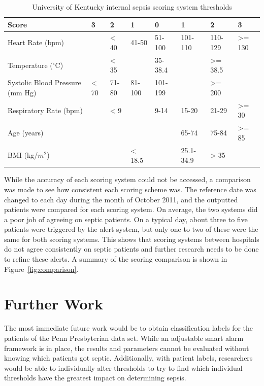 \documentclass{sig-alternate}
\begin{document}
\begin{table}
\renewcommand{\arraystretch}{1.5}
  \begin{tabular}{| l | l | l | l | l | l | l | l |}
\hline

{\bf Score} & {\bf 3} & {\bf 2} & {\bf 1} & {\bf 0} & {\bf 1} & {\bf 2} & {\bf 3}\\ \hline
Heart Rate (bpm) & & < 40 & 41-50 & 51-100 & 101-110 & 110-129 & >= 130\\ \hline
Temperature ($^\circ$C) & & < 35 & & 35-38.4 & & >= 38.5 &\\ \hline
Systolic Blood Pressure (mm Hg) & < 70 & 71-80 & 81-100 & 101-199 & & >= 200 & \\ \hline
Respiratory Rate (bpm) & & < 9 & & 9-14 & 15-20 & 21-29 & >= 30\\ \hline
Age (years) & & & & & 65-74 & 75-84 & >= 85\\ \hline
BMI (kg/$m^2$) & & & < 18.5 & & 25.1-34.9 & > 35 & \\ \hline

 \end{tabular}
	\caption{University of Kentucky internal sepsis scoring system thresholds}
  \label{tab:uk_table}
\end{table}

While the accuracy of each scoring system could not be accessed, a comparison was made to see how consistent each scoring scheme was.  The reference date was changed to each day during the month of October 2011, and the outputted patients were compared for each scoring system.  On average, the two systems did a poor job of agreeing on septic patients.  On a typical day, about three to five patients were triggered by the alert system, but only one to two of these were the same for both scoring systems.  This shows that scoring systems between hospitals do not agree consistently on septic patients and further research needs to be done to refine these alerts.  A summary of the scoring comparison is shown in Figure~\ref{fig:comparison}.

\vspace{10pt}
\section{Further Work}
\vspace{10pt}
\label{sec:furtherwork}

The most immediate future work would be to obtain classification labels for the patients of the Penn Presbyterian data set.  While an adjustable smart alarm framework is in place, the results and parameters cannot be evaluated without knowing which patients got septic.  Additionally, with patient labels, researchers would be able to individually alter thresholds to try to find which individual thresholds have the greatest impact on determining sepsis.  
\end{document}
